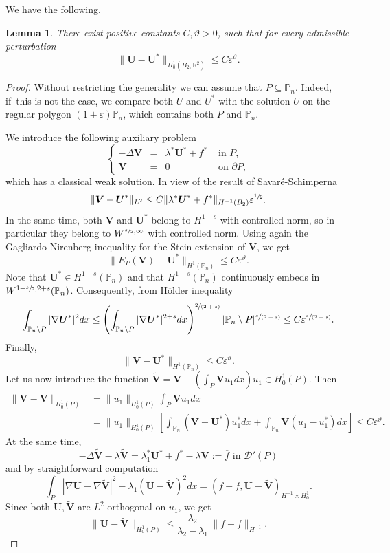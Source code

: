 \documentclass[11pt]{article}
\numberwithin{equation}{section}\newtheorem*{jepEnonce}{\jepEnonceTitle}\newenvironment{enonce*}[1]{\def\jepEnonceTitle{#1}\jepEnonce}{\endjepEnonce}\newtheorem*{conj*}{Conjecture}
\newcommand{\spfrac}[2]{\sfrac{#1}{(#2)}}
\theoremstyle{plain}
\newtheorem{lemma}[thm]{Lemma}
\theoremstyle{definition}
\newcommand{\bo}[1]{{\boldsymbol#1}}
\newcommand{\thetathree}{\vartheta}
\let\Bbb\mathbb
\def\R{\mathbb{R}}
\newcommand{\vps}{\varepsilon}
\newcommand{\lb}{\lambda}
\newcommand{\sm}{\setminus}
\newcommand{\sq}{\subseteq}
\newcommand{\ov}{\overline}
\let\jepOriginalSfrac\sfrac
\renewcommand{\sfrac}[2]{{\jepOriginalSfrac{#1}{#2}}}
\begin{document}
We have the following.
\begin{lemma} \label{bobu29}
There exist positive constants $C, \thetathree >0$, such that for every admissible perturbation
\[
\|\bo U-\bo U^*\|_{H^1_0(B_2, \R^2)} \le C \vps^\thetathree.
\]
\end{lemma}
\begin{proof}
Without restricting the generality we can assume that $P \sq \Bbb P_n$. Indeed, if~this is not the case, we compare both $U$ and $U^*$ with the solution $U$ on the regular polygon $(1+\vps) \Bbb P_n$, which contains both $P$ and $\Bbb P_n$.

We introduce the following auxiliary problem
\begin{equation}\left\{ \begin{array}{rcll}
-\Delta \bo V & =&\lb^* \bo U^* + f^* & \text{ in }P,\\
\bo V &= &0 & \text{ on }\partial P,
\end{array} \right.
\end{equation}
which has a classical weak solution. In view of the result of Savaré-Schimperna \cite[Th.\,8.5]{SaSc02}
\begin{equation}\label{bobu42}
\|\bo V- \bo U^*\|_{L^2} \le C \| \lb^* \bo U^* + f^*\|_{H^{-1} (B_2)} \varepsilon^{\sfrac 12}.
\end{equation}
In the same time, both $\bo V$ and $\bo U^*$ belong to $H^{1+s}$ with controlled norm, so in particular they belong to $W^{\sfrac s2, \infty}$ with controlled norm. Using again the Gagliardo-Nirenberg inequality for the Stein extension of $\bo V$, we get
\[
\|E_P(\bo V)- \bo U^*\|_{H^1(\Bbb P_n)} \le C \vps^\thetathree.
\]
Note that $\bo U^* \!\in\! H^{1+s} (\Bbb P_n)$ and that $H^{1+s} (\Bbb P_n)$ continuously embeds in $W^{1+\sfrac s2, 2+s} (\Bbb P_n)$. Consequently, from Hölder inequality
\[
\int_{\Bbb P_n \sm P} |\nabla \bo U^* |^2 dx \le \left(\int_{\Bbb P_n \sm P} |\nabla \bo U^* |^{2+s} dx\right)^{\spfrac{2}{2+s}} | \Bbb P_n \sm P|^ {\spfrac{s}{2+s}} \le C\vps^{\spfrac{s}{2+s}}.
\]
Finally,
\[
\|\bo V- \bo U^*\|_{H^1(\Bbb P_n)} \le C \vps^\thetathree.
\]
Let us now introduce the function
$\tilde{\bo{V}}= \bo V - (\int_P \bo Vu_1 dx)u_1\in H^1_0(P)$. Then
\begin{align*} \|\bo V-\tilde{\bo{V}} \|_{H^1_0(P)} & = \|u_1\|_{H^1_0(P)} \int _P \bo Vu_1 dx \\
& = \|u_1\|_{H^1_0(P)}\left[\int_{\Bbb P_n} (\bo V- \bo U^*)u_1^* dx + \int_{\mathbb P_n} \bo V(u_1-u_1^*) dx\right]\le C \vps^\thetathree.
\end{align*}
At the same time,
\[
-\Delta \tilde{\bo{V}} - \lb \tilde{\bo{V}}= \lb_1^* \bo U^* +f^*-\lb\bo V := \ov f \mbox{ in } {\mathcal D}'(P)
\]
and by straightforward computation
\[
\int_{P} |\nabla \bo U -\nabla \tilde{\bo{V}} |^2 - \lb_1 (\bo U -\tilde{\bo{V}})^2 dx = (f -\ov f, \bo U -\tilde{\bo{V}})_{H^{-1}\times H_0^1}.
\]
Since both $ \bo U, \tilde{\bo{V}}$ are $L^2$-orthogonal on $u_1$, we get
\[
\| \bo U -\tilde{\bo{V}} \|_{H^1_0(P)} \le \frac{\lb_2}{\lb_2-\lb_1}\, \| f -\ov f\| _{H^{-1}}.
\]


\end{proof}
\end{document}
